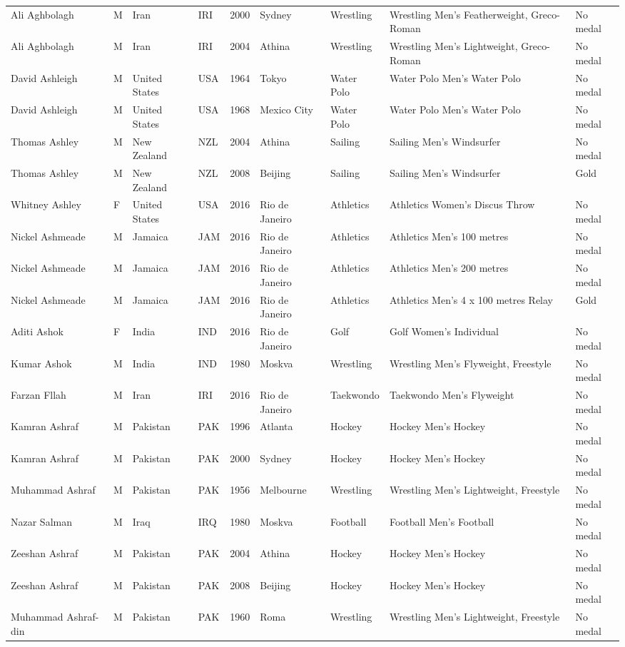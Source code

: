 \documentclass{article}%
\begin{document}
\begin{longtable}{l l l l l l l l l}
Ali Aghbolagh&M&Iran&IRI&2000&Sydney&Wrestling&Wrestling Men's Featherweight, Greco{-}Roman&No medal\\%
Ali Aghbolagh&M&Iran&IRI&2004&Athina&Wrestling&Wrestling Men's Lightweight, Greco{-}Roman&No medal\\%
David Ashleigh&M&United States&USA&1964&Tokyo&Water Polo&Water Polo Men's Water Polo&No medal\\%
David Ashleigh&M&United States&USA&1968&Mexico City&Water Polo&Water Polo Men's Water Polo&No medal\\%
Thomas Ashley&M&New Zealand&NZL&2004&Athina&Sailing&Sailing Men's Windsurfer&No medal\\%
Thomas Ashley&M&New Zealand&NZL&2008&Beijing&Sailing&Sailing Men's Windsurfer&Gold\\%
Whitney Ashley&F&United States&USA&2016&Rio de Janeiro&Athletics&Athletics Women's Discus Throw&No medal\\%
Nickel Ashmeade&M&Jamaica&JAM&2016&Rio de Janeiro&Athletics&Athletics Men's 100 metres&No medal\\%
Nickel Ashmeade&M&Jamaica&JAM&2016&Rio de Janeiro&Athletics&Athletics Men's 200 metres&No medal\\%
Nickel Ashmeade&M&Jamaica&JAM&2016&Rio de Janeiro&Athletics&Athletics Men's 4 x 100 metres Relay&Gold\\%
Aditi Ashok&F&India&IND&2016&Rio de Janeiro&Golf&Golf Women's Individual&No medal\\%
Kumar Ashok&M&India&IND&1980&Moskva&Wrestling&Wrestling Men's Flyweight, Freestyle&No medal\\%
Farzan Fllah&M&Iran&IRI&2016&Rio de Janeiro&Taekwondo&Taekwondo Men's Flyweight&No medal\\%
Kamran Ashraf&M&Pakistan&PAK&1996&Atlanta&Hockey&Hockey Men's Hockey&No medal\\%
Kamran Ashraf&M&Pakistan&PAK&2000&Sydney&Hockey&Hockey Men's Hockey&No medal\\%
Muhammad Ashraf&M&Pakistan&PAK&1956&Melbourne&Wrestling&Wrestling Men's Lightweight, Freestyle&No medal\\%
Nazar Salman&M&Iraq&IRQ&1980&Moskva&Football&Football Men's Football&No medal\\%
Zeeshan Ashraf&M&Pakistan&PAK&2004&Athina&Hockey&Hockey Men's Hockey&No medal\\%
Zeeshan Ashraf&M&Pakistan&PAK&2008&Beijing&Hockey&Hockey Men's Hockey&No medal\\%
Muhammad Ashraf{-}din&M&Pakistan&PAK&1960&Roma&Wrestling&Wrestling Men's Lightweight, Freestyle&No medal\\%

\end{longtable}
\end{document}

